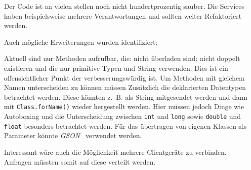 Der Code ist an vielen stellen noch nicht hundertprozentig sauber. Die Services haben beispielsweise mehrere Verantwortungen und sollten weiter Refaktoriert werden.

Auch mögliche Erweiterungen wurden identifiziert:

Aktuell sind nur Methoden aufrufbar, die: nicht überladen sind; nicht doppelt existieren und die nur primitive Typen und String verwenden. Dies ist ein offensichtlicher Punkt der verbesserungswürdig ist. Um Methoden mit gleichem Namen unterscheiden zu können müssen Zusätzlich die deklarierten Datentypen betrachtet werden. Diese könnten z.~B. als String mitgesendet werden und dann mit \lstinline{Class.forName()} wieder hergestellt werden. Hier müssen jedoch Dinge wie Autoboxing und die Unterscheidung zwischen \lstinline{int} und \lstinline{long} sowie \lstinline{double} und \lstinline{float} besonders betrachtet werden. Für das übertragen von eigenen Klassen als Parameter könnte \emph{GSON}~\cite{GoogleInc2014} verwendet werden.

Interessant wäre auch die Möglichkeit mehrere Clientgeräte zu verbinden. Anfragen müssten somit auf diese verteilt werden.
%
